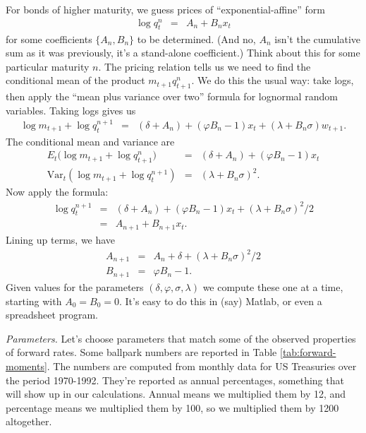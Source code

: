 \documentclass[11pt]{article}
\begin{document}
For bonds of higher maturity, we
guess prices of ``exponential-affine'' form
\begin{eqnarray*}
    \log q^n_t &=& A_n + B_n x_t
\end{eqnarray*}
for some coefficients $\{ A_n, B_n\}$ to be determined.
(And no, $A_n$ isn't the cumulative sum as it was previously,
it's a stand-alone coefficient.)
Think about this for some particular maturity $n$.
The pricing relation tells us we
need to find the conditional mean of the product
$m_{t+1} q^n_{t+1}$.
We do this the usual way:  take logs,
then apply the ``mean plus variance over two'' formula for
lognormal random variables.
Taking logs gives us
\begin{eqnarray*}
    \log m_{t+1} + \log q^{n+1}_t &=&
            (\delta + A_n) + (\varphi B_n -1) x_t + (\lambda + B_n \sigma) w_{t+1} .
\end{eqnarray*}
The conditional mean and variance are
\begin{eqnarray*}
   E_t \Big( \log m_{t+1} + \log q^{n}_{t+1} \Big) &=&
            (\delta + A_n) + (\varphi B_n -1) x_t \\
   \mbox{Var}_t \left( \log m_{t+1} + \log q^{n+1}_t \right) &=&
            (\lambda + B_n \sigma)^2 .
\end{eqnarray*}
Now apply the formula:
\begin{eqnarray*}
    \log q^{n+1}_t &=&
            (\delta + A_n) + (\varphi B_n -1) x_t + (\lambda + B_n \sigma)^2/2 \\
                &=& A_{n+1} + B_{n+1} x_t.
\end{eqnarray*}
Lining up terms, we have
\begin{eqnarray*}
    A_{n+1} &=& A_n + \delta + (\lambda + B_n\sigma)^2/2 \\
    B_{n+1} &=& \varphi B_n - 1 .
\end{eqnarray*}
Given values for the parameters $(\delta, \varphi, \sigma, \lambda)$
we compute these one at a time,
starting with $A_0 = B_0 = 0$.
It's easy to do this in (say) Matlab, or even a spreadsheet program.

{\it Parameters.\/}
Let's choose parameters that match some of the observed
properties of forward rates.
Some ballpark numbers are reported in Table \ref{tab:forward-moments}.
The numbers are  computed from monthly data for US Treasuries
over the period 1970-1992.
They're reported as annual
percentages, something that will show up in our calculations.
Annual means we multiplied them by 12, and percentage means we multiplied them by 100,
so we multiplied them by 1200 altogether.
\end{document}
